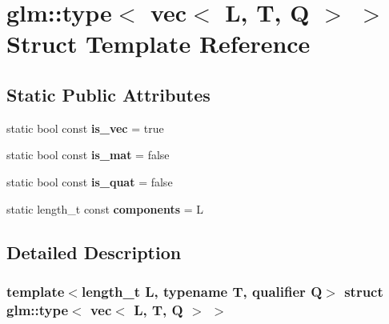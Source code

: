 \hypertarget{structglm_1_1type_3_01vec_3_01L_00_01T_00_01Q_01_4_01_4}{}\section{glm\+:\+:type$<$ vec$<$ L, T, Q $>$ $>$ Struct Template Reference}
\label{structglm_1_1type_3_01vec_3_01L_00_01T_00_01Q_01_4_01_4}
\subsection*{Static Public Attributes}
\begin{DoxyCompactItemize}
\item 
\mbox{\label{structglm_1_1type_3_01vec_3_01L_00_01T_00_01Q_01_4_01_4_a43041d99d1a7516c028d1f8dd8ac7daf}} 
static bool const {\bfseries is\+\_\+vec} = true
\item 
\mbox{\label{structglm_1_1type_3_01vec_3_01L_00_01T_00_01Q_01_4_01_4_a22bba98c88e09815e508383d406fcbab}} 
static bool const {\bfseries is\+\_\+mat} = false
\item 
\mbox{\label{structglm_1_1type_3_01vec_3_01L_00_01T_00_01Q_01_4_01_4_a3ffd0878bcefe94549e17188bfb500d5}} 
static bool const {\bfseries is\+\_\+quat} = false
\item 
\mbox{\label{structglm_1_1type_3_01vec_3_01L_00_01T_00_01Q_01_4_01_4_acfe23241fdf64745cc6310996c36aee6}} 
static length\+\_\+t const {\bfseries components} = L
\end{DoxyCompactItemize}


\subsection{Detailed Description}
\subsubsection*{template$<$length\+\_\+t L, typename T, qualifier Q$>$\newline
struct glm\+::type$<$ vec$<$ L, T, Q $>$ $>$}



